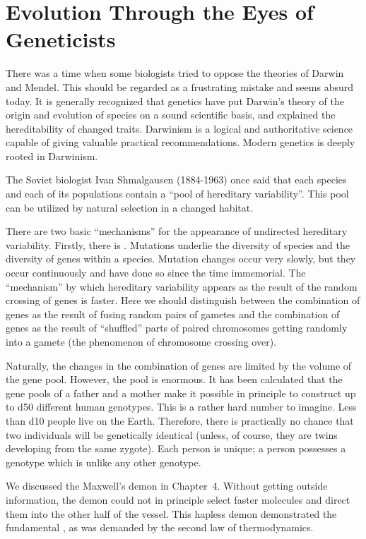 \section{Evolution Through the Eyes of Geneticists}

There was a time when some biologists tried to oppose the theories of
Darwin and Mendel. This should be regarded as a frustrating mistake
and seems absurd today. It is generally recognized that genetics have
put Darwin's theory of the origin and evolution of species on a sound scientific basis, and explained the hereditability of changed traits. Darwinism is a logical and authoritative science capable of giving valuable practical recommendations. Modern genetics is deeply rooted in Darwinism.


 The Soviet biologist Ivan Shmalgausen (1884-1963) once said that each species and each of its populations contain a ``pool of hereditary variability''. This pool can be utilized by natural selection in a changed habitat.


There are two basic ``mechanisms'' for the appearance of undirected hereditary variability. Firstly, there is . Mutations underlie the diversity of species and the diversity of genes within a species. Mutation changes occur very slowly, but they occur continuously and have done so since the time immemorial. The ``mechanism'' by which hereditary variability appears as the result of the random crossing of  genes is faster. Here we should distinguish between the combination of genes as the result of fusing random pairs of gametes and the combination of genes as the result of ``shuffled'' parts of paired chromosomes getting randomly into a gamete (the phenomenon of chromosome crossing over).


Naturally, the changes in the combination of genes are limited by the volume of the gene pool. However, the pool is enormous. It has been calculated that the gene pools of a father and a mother make it possible in principle to construct up to \num{d50} different human genotypes. This is a rather hard number to imagine. Less than \num{d10} people live on the Earth. Therefore, there is practically no chance that two individuals will be genetically identical (unless, of course, they are twins developing from the same zygote). Each person is  unique; a person possesses a genotype which is unlike any other genotype.


 We discussed the Maxwell's demon in Chapter~4. Without getting outside information, the demon could not in principle select faster molecules and direct them into the other half of the vessel. This hapless demon demonstrated the fundamental , as was demanded by the second law of thermodynamics.


